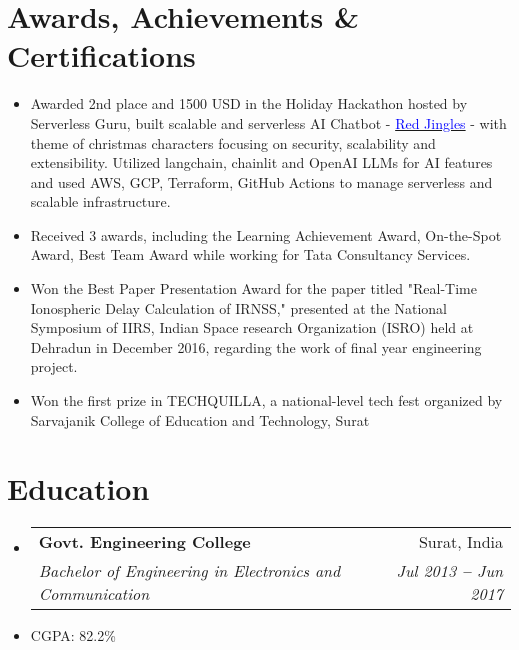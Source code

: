 \documentclass[letterpaper,11pt]{article}
\makeatletter
\newcommand{\resumeItem}[1]{
  \item\small{
    {#1 \vspace{-2pt}}
  }
}
\newcommand{\resumeSubheading}[4]{
  \vspace{-2pt}\item
    \begin{tabular*}{0.97\textwidth}[t]{l@{\extracolsep{\fill}}r}
      \textbf{#1} & #2 \\
      \textit{\small#3} & \textit{\small #4} \\
    \end{tabular*}\vspace{-7pt}
}
\newcommand{\resumeSubHeadingListStart}{\begin{itemize}[leftmargin=0.15in, label={}]}
\newcommand{\resumeSubHeadingListEnd}{\end{itemize}}
\newcommand{\resumeItemListStart}{\begin{itemize}}
\newcommand{\resumeItemListEnd}{\end{itemize}\vspace{-5pt}}
\makeatother
\begin{document}
\section{Awards, Achievements \& Certifications}
\vspace{2pt}
\resumeSubHeadingListStart
\small{\item{
  \resumeItemListStart
  \resumeItem{Awarded 2nd place and 1500 USD in the Holiday Hackathon hosted by Serverless Guru, built scalable and serverless AI Chatbot -  {\href{https://www.linkedin.com/posts/riya-j-bhavsar_demo-alert-red-jingles-made-us-win-2nd-activity-7157638824284561408-4u1E}{\textcolor{blue}{Red Jingles}}} - with theme of christmas characters focusing on security, scalability and extensibility. Utilized langchain, chainlit and OpenAI LLMs for AI features and used AWS, GCP, Terraform, GitHub Actions to manage serverless and scalable infrastructure.} 
  \resumeItem{Received 3 awards, including the Learning Achievement Award, On-the-Spot Award, Best Team Award while working for Tata Consultancy Services.}
  \resumeItem{Won the Best Paper Presentation Award for the paper titled "Real-Time Ionospheric Delay Calculation of IRNSS," presented at the National Symposium of IIRS, Indian Space research Organization (ISRO) held at Dehradun in December 2016, regarding the work of final year engineering project.}
  \resumeItem{Won the first prize in TECHQUILLA, a national-level tech fest organized by Sarvajanik College of Education and Technology, Surat}
  \resumeItemListEnd
}}
\resumeSubHeadingListEnd



\section{Education}
\vspace{3pt}
\resumeSubHeadingListStart
\resumeSubheading
{Govt. Engineering College}{Surat, India}
{Bachelor of  Engineering in Electronics and Communication}{Jul 2013 \textbf{--} Jun 2017}
\resumeItem{CGPA: 82.2\%}

\resumeSubHeadingListEnd

\end{document}
